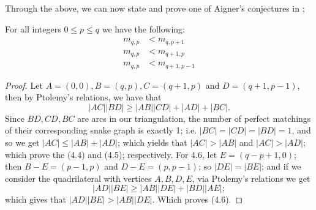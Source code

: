 Through the above, we can now state and prove one of Aigner's conjectures in \cite{A};
\begin{theorem}
    For all integers $0 \leq p \leq q$ we have the following:
    \begin{align}
        m_{q,p} &< m_{q,p+1} \\
        m_{q,p} &< m_{q+1,p} \\
        m_{q,p} &< m_{q+1,p-1}
    \end{align}
\end{theorem}
\begin{proof}
    Let $A = (0,0), B = (q,p), C = (q+1,p)$ and $D = (q+1,p-1)$, then by Ptolemy's relations, we have that
    \begin{equation*}
        |AC||BD| \geq |AB||CD|+|AD|+|BC|.
    \end{equation*}
    Since $BD,CD,BC$ are arcs in our triangulation, the number of perfect matchings of their corresponding snake graph is exactly 1; i.e. $|BC|=|CD|=|BD|=1$, and so we get $|AC| \leq |AB|+|AD|$; which yields that $|AC| > |AB|$ and $|AC| > |AD|$; which prove the (4.4) and (4.5); respectively. For 4.6, let $E = (q-p+1,0)$; then $B-E = (p-1,p)$ and $D-E = (p,p-1)$; so $|DE| = |BE|$; and if we consider the quadrilateral with vertices $A,B,D,E$, via Ptolemy's relations we get
    \begin{equation*}
        |AD||BE| \geq |AB||DE| + |BD||AE|;
    \end{equation*}
    which gives that $|AD||BE| > |AB||DE|$. Which proves (4.6).
\end{proof}

